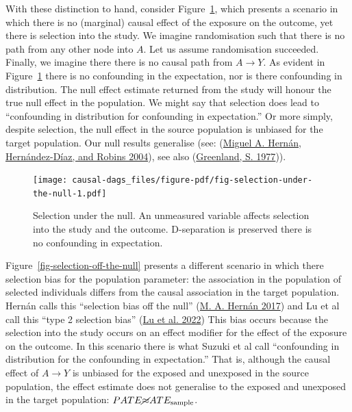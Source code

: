 \documentclass[
  singlecolumn]{report}
\begin{document}
With these distinction to hand, consider
Figure~\ref{fig-selection-under-the-null}, which presents a scenario in
which there is no (marginal) causal effect of the exposure on the
outcome, yet there is selection into the study. We imagine randomisation
such that there is no path from any other node into \(A\). Let us assume
randomisation succeeded. Finally, we imagine there there is no causal
path from \(A \to Y\). As evident in
Figure~\ref{fig-selection-under-the-null} there is no confounding in the
expectation, nor is there confounding in distribution. The null effect
estimate returned from the study will honour the true null effect in the
population. We might say that selection does lead to ``confounding in
distribution for confounding in expectation.'' Or more simply, despite
selection, the null effect in the source population is unbiased for the
target population. Our null results generalise (see:
(\protect\hyperlink{ref-hernuxe1n2004b}{Miguel A. Hernán,
Hernández-Díaz, and Robins 2004}), see also
(\protect\hyperlink{ref-greenlands.1977a}{Greenland, S. 1977})).

\begin{figure}

{\centering \texttt{[image: causal-dags\_files/figure-pdf/fig-selection-under-the-null-1.pdf]}

}

\caption{\label{fig-selection-under-the-null}Selection under the null.
An unmeasured variable affects selection into the study and the outcome.
D-separation is preserved there is no confounding in expectation.}

\end{figure}

Figure~\ref{fig-selection-off-the-null} presents a different scenario in
which there selection bias for the population parameter: the association
in the population of selected individuals differs from the causal
association in the target population. Hernán calls this ``selection bias
off the null'' (\protect\hyperlink{ref-hernuxe1n2017}{M. A. Hernán
2017}) and Lu et al call this ``type 2 selection bias''
(\protect\hyperlink{ref-lu2022a}{Lu et al. 2022}) This bias occurs
because the selection into the study occurs on an effect modifier for
the effect of the exposure on the outcome. In this scenario there is
what Suzuki et al call ``confounding in distribution for the confounding
in expectation.'' That is, although the causal effect of \(A\to Y\) is
unbiased for the exposed and unexposed in the source population, the
effect estimate does not generalise to the exposed and unexposed in the
target population: \(PATE \cancel{\approx} ATE_{\text{sample}}\).
\end{document}
